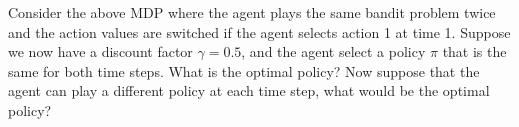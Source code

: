 Consider the above MDP where the agent plays the same bandit problem
twice and the action values are switched if the agent
selects action 1 at time 1.
Suppose we now have a discount factor $\gamma = 0.5$,
and the agent select a policy $\pi$ that is the same for
both time steps. What is the optimal policy?
Now suppose that the agent can play a different policy at
each time step, what would be the optimal policy?
\smallspace





